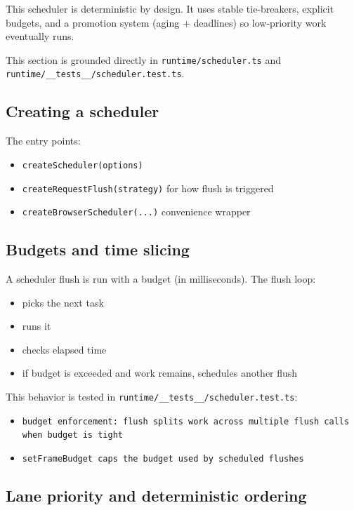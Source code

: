 This scheduler is deterministic by design.
It uses stable tie-breakers, explicit budgets, and a promotion system (aging + deadlines) so low-priority work eventually runs.

This section is grounded directly in \texttt{runtime/scheduler.ts} and \texttt{runtime/\_\_tests\_\_/scheduler.test.ts}.

\subsection{Creating a scheduler}

The entry points:

\begin{itemize}
  \item \texttt{createScheduler(options)}
  \item \texttt{createRequestFlush(strategy)} for how flush is triggered
  \item \texttt{createBrowserScheduler(...)} convenience wrapper
\end{itemize}

\subsection{Budgets and time slicing}

A scheduler flush is run with a budget (in milliseconds). The flush loop:

\begin{itemize}
  \item picks the next task
  \item runs it
  \item checks elapsed time
  \item if budget is exceeded and work remains, schedules another flush
\end{itemize}

This behavior is tested in \texttt{runtime/\_\_tests\_\_/scheduler.test.ts}:

\begin{itemize}
  \item \texttt{budget enforcement: flush splits work across multiple flush calls when budget is tight}
  \item \texttt{setFrameBudget caps the budget used by scheduled flushes}
\end{itemize}

\subsection{Lane priority and deterministic ordering}

